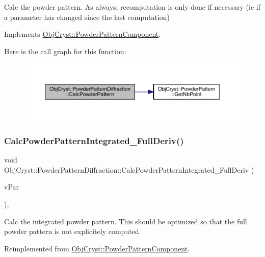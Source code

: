 Calc the powder pattern. As always, recomputation is only done if necessary (ie if a parameter has changed since the last computation) 

Implements \mbox{\hyperlink{class_obj_cryst_1_1_powder_pattern_component_a8417ecb93009a9b7b9fccf074a9438d9}{Obj\+Cryst\+::\+Powder\+Pattern\+Component}}.

Here is the call graph for this function\+:
\nopagebreak
\begin{figure}[H]
\begin{center}
\leavevmode
\includegraphics[width=350pt]{class_obj_cryst_1_1_powder_pattern_diffraction_a4c7d61b5c105ee235629a4dfdbdf9949_cgraph}
\end{center}
\end{figure}
\mbox{\label{class_obj_cryst_1_1_powder_pattern_diffraction_a47a3a1e09d0ab4c4f092384650db3efd}} 
\subsubsection{\texorpdfstring{CalcPowderPatternIntegrated\_FullDeriv()}{CalcPowderPatternIntegrated\_FullDeriv()}}
{\footnotesize\ttfamily void Obj\+Cryst\+::\+Powder\+Pattern\+Diffraction\+::\+Calc\+Powder\+Pattern\+Integrated\+\_\+\+Full\+Deriv (\begin{DoxyParamCaption}\item[{std\+::set$<$ Refinable\+Par $\ast$ $>$ \&}]{v\+Par }\end{DoxyParamCaption})\hspace{0.3cm}{\ttfamily [protected]}, {\ttfamily [virtual]}}

Calc the integrated powder pattern. This should be optimized so that the full powder pattern is not explicitely computed. 

Reimplemented from \mbox{\hyperlink{class_obj_cryst_1_1_powder_pattern_component_a7825422fec4a6ee5f1a00bc4063104ef}{Obj\+Cryst\+::\+Powder\+Pattern\+Component}}.

